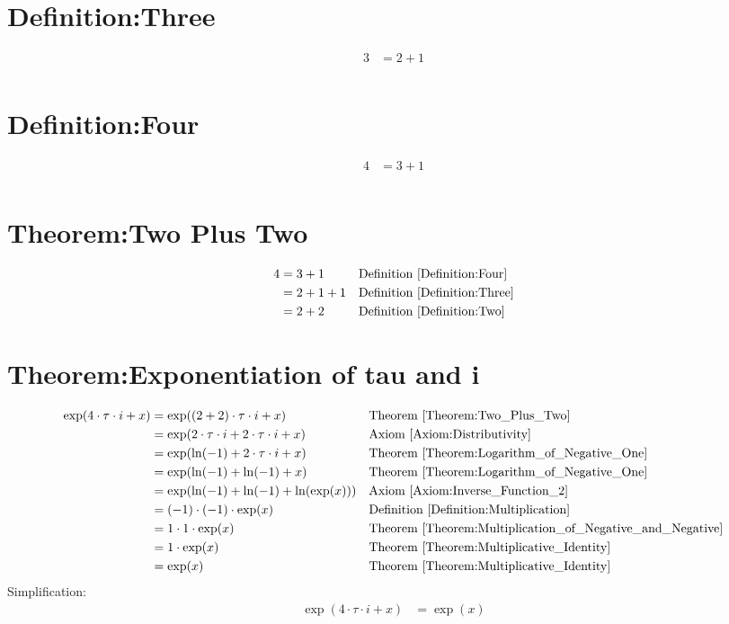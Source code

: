 \documentclass[12pt,a4paper]{report}
\begin{document}
\section{Definition:Three}
\label{Definition:Three}
\begin{align*}
3 &= 2+1 \\
\end{align*}

\section{Definition:Four}
\label{Definition:Four}
\begin{align*}
4 &= 3+1 \\
\end{align*}

\section{Theorem:Two Plus Two}
\label{Theorem:Two_Plus_Two}
\begin{align*}
4
&= 3+1
&& \text{Definition \ref{Definition:Four}} \\
&= 2+1+1
&& \text{Definition \ref{Definition:Three}} \\
&= 2+2
&& \text{Definition \ref{Definition:Two}} \\
\end{align*}

\section{Theorem:Exponentiation of tau and i}
\label{Theorem:Exponentiation_of_tau_i}
\begin{align*}
\exp (4 \cdot \tau \cdot i + x)
&= \exp ((2+2) \cdot \tau \cdot i + x)
&& \text{Theorem \ref{Theorem:Two_Plus_Two}} \\
&= \exp(2 \cdot \tau \cdot i + 2 \cdot \tau \cdot i + x)
&& \text{Axiom \ref{Axiom:Distributivity}} \\
&= \exp(\ln(-1) + 2 \cdot \tau \cdot i + x)
&& \text{Theorem \ref{Theorem:Logarithm_of_Negative_One}} \\
&= \exp(\ln(-1) + \ln(-1) + x)
&& \text{Theorem \ref{Theorem:Logarithm_of_Negative_One}} \\
&= \exp(\ln(-1) + \ln(-1) + \ln(\exp(x)))
&& \text{Axiom \ref{Axiom:Inverse_Function_2}} \\
&= (-1) \cdot (-1) \cdot \exp(x)
&& \text{Definition \ref{Definition:Multiplication}} \\
&= 1 \cdot 1 \cdot \exp(x)
&& \text{Theorem \ref{Theorem:Multiplication_of_Negative_and_Negative}} \\
&= 1 \cdot \exp(x)
&& \text{Theorem \ref{Theorem:Multiplicative_Identity}} \\
&= \exp(x)
&& \text{Theorem \ref{Theorem:Multiplicative_Identity}} \\
\end{align*}
Simplification:
\begin{align}
\exp(4 \cdot \tau \cdot i + x) &= \exp(x) \label{Implementation:Exponentiation_of_tau_i}
\end{align}
\end{document}

